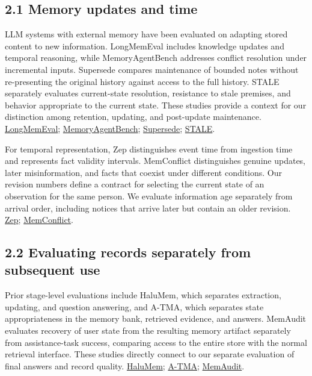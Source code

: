 \documentclass[10pt,a4paper]{article}
\begin{document}
\subsection{2.1 Memory updates and time}\label{paper-02-memory-updates-and-time}

LLM systems with external memory have been evaluated on adapting stored content to new information. LongMemEval includes knowledge updates and temporal reasoning, while MemoryAgentBench addresses conflict resolution under incremental inputs. Supersede compares maintenance of bounded notes without re-presenting the original history against access to the full history. STALE separately evaluates current-state resolution, resistance to stale premises, and behavior appropriate to the current state. These studies provide a context for our distinction among retention, updating, and post-update maintenance. \href{https://arxiv.org/abs/2410.10813v2}{LongMemEval}; \href{https://arxiv.org/abs/2507.05257v1}{MemoryAgentBench}; \href{https://arxiv.org/abs/2606.27472v1}{Supersede}; \href{https://arxiv.org/abs/2605.06527v1}{STALE}.

For temporal representation, Zep distinguishes event time from ingestion time and represents fact validity intervals. MemConflict distinguishes genuine updates, later misinformation, and facts that coexist under different conditions. Our revision numbers define a contract for selecting the current state of an observation for the same person. We evaluate information age separately from arrival order, including notices that arrive later but contain an older revision. \href{https://arxiv.org/abs/2501.13956v1}{Zep}; \href{https://arxiv.org/abs/2605.20926v1}{MemConflict}.

\subsection{2.2 Evaluating records separately from subsequent use}\label{paper-02-evaluating-records-separately-from-subsequent-use}

Prior stage-level evaluations include HaluMem, which separates extraction, updating, and question answering, and A-TMA, which separates state appropriateness in the memory bank, retrieved evidence, and answers. MemAudit evaluates recovery of user state from the resulting memory artifact separately from assistance-task success, comparing access to the entire store with the normal retrieval interface. These studies directly connect to our separate evaluation of final answers and record quality. \href{https://arxiv.org/abs/2511.03506v1}{HaluMem}; \href{https://arxiv.org/abs/2607.01935v1}{A-TMA}; \href{https://arxiv.org/abs/2606.24595v2}{MemAudit}.
\end{document}
